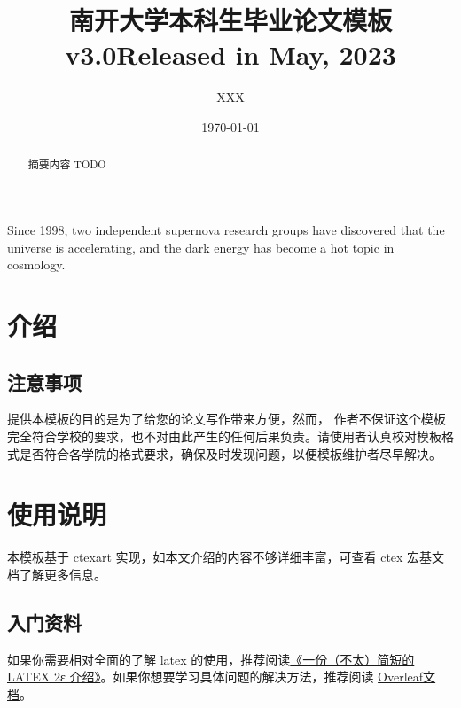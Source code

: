 \documentclass{nktba}
\title{南开大学本科生毕业论文模板\\ v3.0}
\title*{Released in May, 2023}
\author{XXX}
\date{\today}
\begin{document}

\maketitle
\begin{titlepage}
  \declaration
\end{titlepage}

\begin{abstract}
摘要内容 TODO
\end{abstract}
  
\begin{abstract*}
Since 1998, two independent supernova research groups have discovered that the universe is accelerating, and the dark energy has become a hot topic in cosmology. 
\end{abstract*}

\tableofcontents


\section{介绍}

\subsection{注意事项}

提供本模板的目的是为了给您的论文写作带来方便，然而，
作者不保证这个模板完全符合学校的要求，也不对由此产生的任何后果负责。请使用者认真校对模板格式是否符合各学院的格式要求，确保及时发现问题，以便模板维护者尽早解决。



\section{使用说明} \label{chpt:A}

本模板基于 ctexart 实现，如本文介绍的内容不够详细丰富，可查看 ctex 宏基文档了解更多信息。

\subsection{入门资料}

如果你需要相对全面的了解 latex 的使用，推荐阅读\href{http://mirrors.ctan.org/info/lshort/chinese/lshort-zh-cn.pdf}{《一份（不太）简短的 LATEX 2ε 介绍》}。如果你想要学习具体问题的解决方法，推荐阅读 \href{https://www.overleaf.com/learn}{Overleaf文档}。
\end{document}
